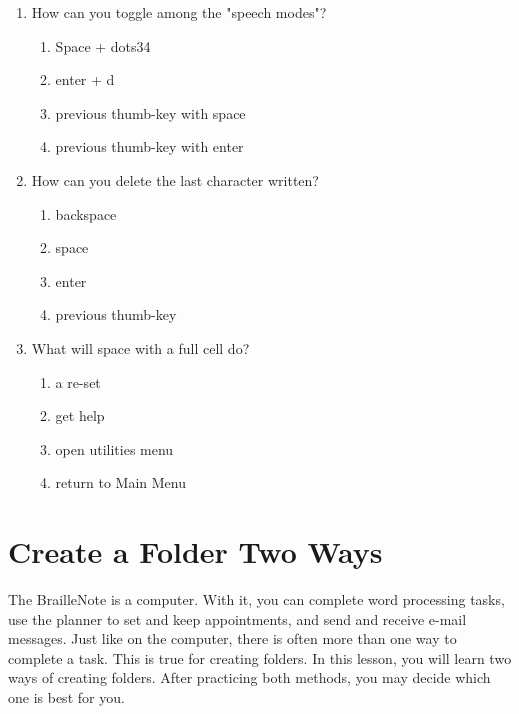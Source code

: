 \documentclass[10pt,letterpaper,twoside]{report}
\begin{document}
{\begin{enumerate}
\begin{enumerate}
			      \item backspace
		      \end{enumerate}
		\item How can you toggle among the "speech modes"?
		      \begin{enumerate}
			      \item Space + dots34
			      \item enter + d
			      \item previous thumb-key with space
			      \item previous thumb-key with enter
		      \end{enumerate}
		\item How can you delete the last character written?
		      \begin{enumerate}
			      \item backspace
			      \item space
			      \item enter
			      \item previous thumb-key
		      \end{enumerate}
		\item What will space with a full cell do?
		      \begin{enumerate}
			      \item a re-set
			      \item get help
			      \item open utilities menu
			      \item return to Main Menu
		      \end{enumerate}
	\end{enumerate} }

\clearpage

\section{Create a Folder Two Ways}
The BrailleNote is a computer. With it, you can complete word processing tasks, use the planner to set and keep appointments, and send and receive e-mail messages. Just like on the computer, there is often more than one way to complete a task. This is true for creating folders. In this lesson, you will learn two ways of creating folders. After practicing both methods, you may decide which one is best for you.
\end{document}
